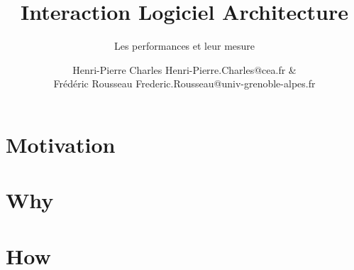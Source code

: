 \documentclass[aspectratio=169]{beamer}
\title{Interaction Logiciel Architecture}
\subtitle{Les performances et leur mesure}
\author{Henri-Pierre Charles Henri-Pierre.Charles@cea.fr \& \\
Frédéric Rousseau Frederic.Rousseau@univ-grenoble-alpes.fr}
\date{}
\newcommand{\Slide}[1]{}
\begin{document}
\begin{frame}
\titlepage
\end{frame}

\section{Motivation}
\Slide{Metrics/HowMany}
\Slide{Metrics/Moore}
\Slide{Metrics/Top500}
\Slide{Metrics/Opportunity}

\begin{frame}
  \begin{multicols}{2}
    \tableofcontents[]
  \end{multicols}
\end{frame}
\section{Why}
\Slide{Metrics/VonNeumann}
\Slide{Metrics/HowToMeasure}
\Slide{Metrics/FLOPS}
\Slide{Metrics/Sustained}
\Slide{Metrics/FLOPS}
\Slide{Metrics/IPC}
\Slide{Metrics/Lois}
\Slide{Metrics/Speedup}
\Slide{Metrics/Amdahl}
\Slide{Metrics/Roofline}
\Slide{Metrics/Roofline2}

\section{How}
\Slide{Comment/Outillage}
\Slide{Comment/C2}
\Slide{Comment/gprof}
\Slide{Comment/gprof-example}
\Slide{Comment/PerfCounter}
\Slide{Comment/PerfCounter-example}
\Slide{Comment/JTAG}
\Slide{Comment/FPGA}
\Slide{Comment/HwEmulator}
\Slide{Comment/gdb}
\Slide{Comment/qemu}
\Slide{Comment/CrossCompiler}
\Slide{Comment/Stats}
\end{document}
